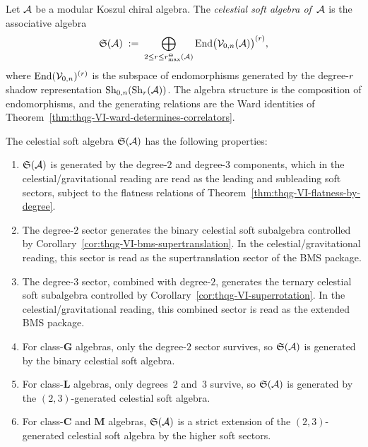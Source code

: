 \begin{definition}
Let $\mathcal{A}$ be a modular Koszul chiral algebra. The
\emph{celestial soft algebra of~$\mathcal{A}$} is the associative algebra
\begin{equation}%
\mathfrak{S}(\cA)
\;:=\;
\bigoplus_{2\le r\le r^\Theta_{\max}(\cA)}
\End\bigl(\cV_{0,n}(\cA)\bigr)^{(r)},
\end{equation}
where $\operatorname{End}(\mathcal{V}_{0,n})^{(r)}$ is the subspace of endomorphisms
generated by the degree-$r$ shadow representation
$\operatorname{Sh}_{0,n}(\operatorname{Sh}_r(\mathcal{A}))$. The algebra structure is the
composition of endomorphisms, and the generating relations are
the Ward identities of
Theorem~\ref{thm:thqg-VI-ward-determines-correlators}.
\end{definition}

\begin{proposition}
The celestial soft algebra $\mathfrak{S}(\mathcal{A})$ has the following
properties:
\begin{enumerate}[label=\textup{(\roman*)}]
\item $\mathfrak{S}(\mathcal{A})$ is generated by the degree-$2$ and
 degree-$3$ components, which in the celestial/gravitational
 reading are read as the leading and subleading soft sectors,
 subject to the flatness relations of
 Theorem~\ref{thm:thqg-VI-flatness-by-degree}.
\item The degree-$2$ sector generates the binary celestial soft
 subalgebra controlled by
 Corollary~\ref{cor:thqg-VI-bms-supertranslation}. In the
 celestial/gravitational reading, this sector is read as the
 supertranslation sector of the BMS package.
\item The degree-$3$ sector, combined with degree-$2$, generates the
 ternary celestial soft subalgebra controlled by
 Corollary~\ref{cor:thqg-VI-superrotation}. In the
 celestial/gravitational reading, this combined sector is read as
 the extended BMS package.
\item For class-$\mathbf{G}$ algebras, only the degree-$2$ sector
 survives, so $\mathfrak{S}(\mathcal{A})$ is generated by the binary
 celestial soft algebra.
\item For class-$\mathbf{L}$ algebras, only degrees~$2$ and~$3$
 survive, so $\mathfrak{S}(\mathcal{A})$ is generated by the
 $(2,3)$-generated celestial soft algebra.
\item For class-$\mathbf{C}$ and $\mathbf{M}$ algebras,
 $\mathfrak{S}(\mathcal{A})$ is a strict extension of the
 $(2,3)$-generated celestial soft algebra by the higher soft
 sectors.
\end{enumerate}
\end{proposition}

